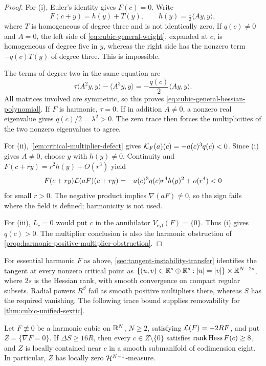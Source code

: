 \begin{proof}
For (i),
Euler's identity gives $F(c)=0$. Write
\[
 F(c+y)=h(y)+T(y),\qquad
 h(y)=\tfrac12\langle Ay,y\rangle,
\]
where $T$ is homogeneous of degree three and is not identically zero.
If $q(c)\ne0$ and $A=0$, the left side of \eqref{eq:cubic-general-weight}, expanded
at $c$, is homogeneous of degree five in $y$, whereas the right side
has the nonzero term $-q(c)T(y)$ of degree three. This is impossible.

The terms of degree two in the same equation are
\[
 \tau\langle A^2y,y\rangle-\langle A^3y,y\rangle
 =-\frac{q(c)}2\langle Ay,y\rangle.
\]
All matrices involved are symmetric, so this proves
\eqref{eq:cubic-general-hessian-polynomial}. If $F$ is harmonic,
$\tau=0$. If in addition $A\ne0$, a nonzero real eigenvalue gives
$q(c)/2=\lambda^2>0$. The zero trace then forces the multiplicities
of the two nonzero eigenvalues to agree.

For (ii), \cref{lem:critical-multiplier-defect} gives
\(\mathcal K_F(a)(c)=-a(c)^3q(c)<0\). Since (i) gives \(A\ne0\),
choose \(y\) with \(h(y)\ne0\). Continuity and
\(F(c+ry)=r^2h(y)+O(r^3)\) yield
\begin{equation}\label{eq:cubic-positive-multiplier-leading-sign}
 F(c+ry)\mathcal L(aF)(c+ry)
 =-a(c)^3q(c)r^4h(y)^2+o(r^4)<0
\end{equation}
for small \(r>0\). The negative product implies
\(\nabla(aF)\ne0\), so the sign fails where the field is defined;
harmonicity is not used.

For (iii), \(L_c=0\) would put \(c\) in the annihilator
\(V_{\mathrm{cyl}}(F)=\{0\}\). Thus (i) gives \(q(c)>0\).
The multiplier conclusion is also the harmonic obstruction of
\cref{prop:harmonic-positive-multiplier-obstruction}.
\end{proof}

For essential harmonic $F$ as above, \cref{sec:tangent-instability-transfer}
identifies the tangent at every nonzero critical point as
$\{(u,v)\in\mathbb R^s\oplus\mathbb R^s:|u|=|v|\}\times\mathbb R^{N-2s}$,
where $2s$ is the Hessian rank, with smooth convergence on compact
regular subsets. Radial powers $R^\beta$ fail as smooth positive
multipliers there, whereas $S$ has the required vanishing.
The following trace bound supplies removability for
\cref{thm:cubic-unified-sextic}.

\begin{lemma}
\label{lem:cubic-trace-removability}
Let \(F\not\equiv0\) be a harmonic cubic on \(\mathbb R^N\), \(N\ge2\),
satisfying \(\mathcal L(F)=-2RF\), and put \(Z=\{\nabla F=0\}\).
If \(\Delta S\ge16R\), then every \(c\in Z\setminus\{0\}\)
satisfies \(\operatorname{rank}\operatorname{Hess} F(c)\ge8\), and \(Z\) is locally
contained near \(c\) in a smooth submanifold of codimension eight.
In particular, \(Z\) has locally zero \(\mathcal H^{N-1}\)-measure.
\end{lemma}

